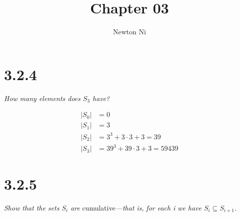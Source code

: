 \documentclass{article}
\title{Chapter 03}
\author{Newton Ni}
\newcommand{\cardinality}[1]{\lvert#1\rvert}
\theoremstyle{remark}
\begin{document}
\maketitle

\section{3.2.4}

    \textit{How many elements does $S_3$ have?}

    \begin{align*}
        \cardinality{S_0} &= 0 \\
        \cardinality{S_1} &= 3 \\
        \cardinality{S_2} &= 3^3 + 3 \cdot 3 + 3 = 39 \\
        \cardinality{S_3} &= 39^3 + 39 \cdot 3 + 3 = 59439
    \end{align*}

\section{3.2.5}

    \textit{Show that the sets $S_i$ are }cumulative\textit{---that is,}
    \textit{for each i we have $S_i \subseteq S_{i + 1}$.}
\end{document}
